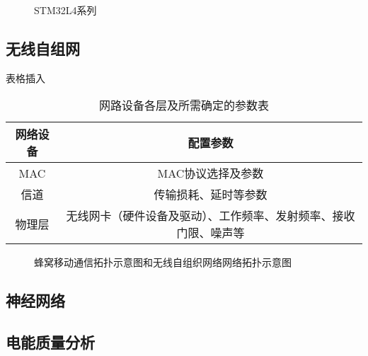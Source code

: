\documentclass[UTF8，a4paper]{ctexrep}
\begin{document}
  \begin{figure}[ht]
  \centering
  \caption{STM32L4系列}
  \label{fig:STM32L4系列}
  \end{figure}


  \subsection{无线自组网}
  表格插入

  \begin{table}[ht]
    \centering
    \caption{网路设备各层及所需确定的参数表}
    \begin{tabular}{c|c}
      \toprule
      网络设备  & 配置参数 \\
      \hline
      MAC     &   MAC协议选择及参数\\
      \hline
      信道    &    传输损耗、延时等参数\\
      \hline
      物理层    &   无线网卡（硬件设备及驱动）、工作频率、发射频率、接收门限、噪声等\\
      \bottomrule
    \end{tabular}
  \end{table}
  
\begin{figure}[ht]
  \centering
  \caption{蜂窝移动通信拓扑示意图和无线自组织网络网络拓扑示意图}
  \label{fig:蜂窝移动通信拓扑示意图和无线自组织网络网络拓扑示意图}
\end{figure}
  \subsection{神经网络}
  \subsection{电能质量分析}
\end{document}
